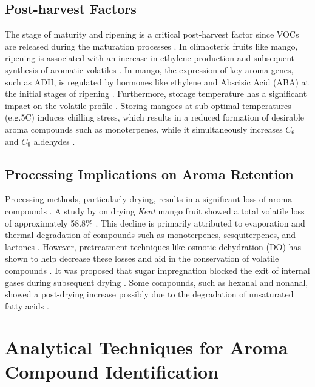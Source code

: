 \subsection{Post-harvest Factors}
The stage of maturity and ripening is a critical post-harvest factor since VOCs are released during the maturation processes \cite*{A01_Aguirre-Lopez_2023,A13_ElHadi2013}. In climacteric fruits like mango, ripening is associated with an increase in ethylene production and subsequent synthesis of aromatic volatiles \cite*{A05_Chin2019}. In mango, the expression of key aroma genes, such as ADH, is regulated by hormones like ethylene and Abscisic Acid (ABA) at the initial stages of ripening \cite*{A10_Singh2010}. Furthermore, storage temperature has a significant impact on the volatile profile \cite*{A13_ElHadi2013}. Storing mangoes at sub-optimal temperatures (e.g.5\textdegree C) induces chilling stress, which results in a reduced formation of desirable aroma compounds such as monoterpenes, while it simultaneously increases $C_6$ and $C_9$ aldehydes \cite*{A11_Sivankalyani2017}.


\subsection{Processing Implications on Aroma Retention}
Processing methods, particularly drying, results in a significant loss of aroma compounds \cite*{A07_Bonneau2016}. A study by \textcite{A07_Bonneau2016} on drying \textit{Kent} mango fruit showed a total volatile loss of approximately 58.8\% \cite*{A07_Bonneau2016,A16_Tandel2023}. This decline is primarily attributed to evaporation and thermal degradation of compounds such as monoterpenes, sesquiterpenes, and lactones \cite*{A07_Bonneau2016}. However, pretreatment techniques like osmotic dehydration (DO) has shown to help decrease these losses and aid in the conservation of volatile compounds \cite*{A02_Moreno2010}. It was proposed that sugar impregnation blocked the exit of internal gases during subsequent drying \cite*{A02_Moreno2010}. Some compounds, such as hexanal and nonanal, showed a post-drying increase possibly due to the degradation of unsaturated fatty acids \cite*{A07_Bonneau2016}.

\section{Analytical Techniques for Aroma Compound Identification}
